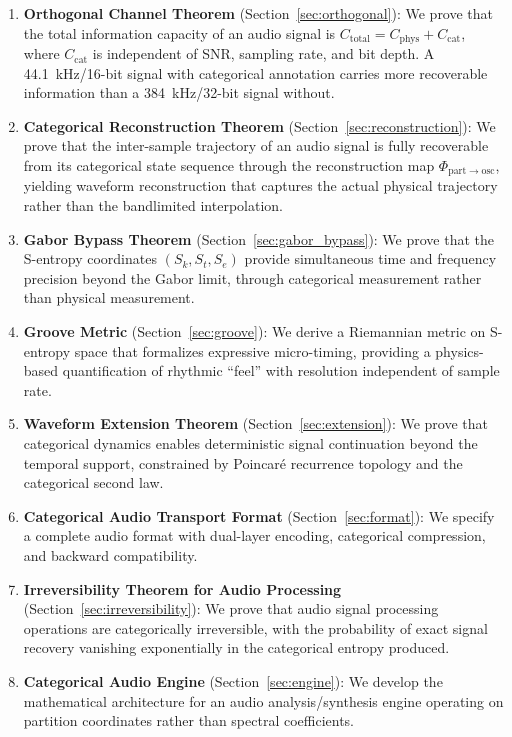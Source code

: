 \documentclass[twocolumn,10pt]{article}
\theoremstyle{remark}
\newcommand{\Sk}{S_k}
\newcommand{\St}{S_t}
\newcommand{\Se}{S_e}
\newcommand{\Ccat}{C_{\mathrm{cat}}}
\newcommand{\Cphys}{C_{\mathrm{phys}}}
\begin{document}
\begin{enumerate}
    \item \textbf{Orthogonal Channel Theorem} (Section~\ref{sec:orthogonal}): We prove that the total information capacity of an audio signal is $C_{\mathrm{total}} = \Cphys + \Ccat$, where $\Ccat$ is independent of SNR, sampling rate, and bit depth. A 44.1~kHz/16-bit signal with categorical annotation carries more recoverable information than a 384~kHz/32-bit signal without.

    \item \textbf{Categorical Reconstruction Theorem} (Section~\ref{sec:reconstruction}): We prove that the inter-sample trajectory of an audio signal is fully recoverable from its categorical state sequence through the reconstruction map $\Phi_{\mathrm{part} \to \mathrm{osc}}$, yielding waveform reconstruction that captures the actual physical trajectory rather than the bandlimited interpolation.

    \item \textbf{Gabor Bypass Theorem} (Section~\ref{sec:gabor_bypass}): We prove that the S-entropy coordinates $(\Sk, \St, \Se)$ provide simultaneous time and frequency precision beyond the Gabor limit, through categorical measurement rather than physical measurement.

    \item \textbf{Groove Metric} (Section~\ref{sec:groove}): We derive a Riemannian metric on S-entropy space that formalizes expressive micro-timing, providing a physics-based quantification of rhythmic ``feel'' with resolution independent of sample rate.

    \item \textbf{Waveform Extension Theorem} (Section~\ref{sec:extension}): We prove that categorical dynamics enables deterministic signal continuation beyond the temporal support, constrained by Poincar\'{e} recurrence topology and the categorical second law.

    \item \textbf{Categorical Audio Transport Format} (Section~\ref{sec:format}): We specify a complete audio format with dual-layer encoding, categorical compression, and backward compatibility.

    \item \textbf{Irreversibility Theorem for Audio Processing} (Section~\ref{sec:irreversibility}): We prove that audio signal processing operations are categorically irreversible, with the probability of exact signal recovery vanishing exponentially in the categorical entropy produced.

    \item \textbf{Categorical Audio Engine} (Section~\ref{sec:engine}): We develop the mathematical architecture for an audio analysis/synthesis engine operating on partition coordinates rather than spectral coefficients.
\end{enumerate}
\end{document}
